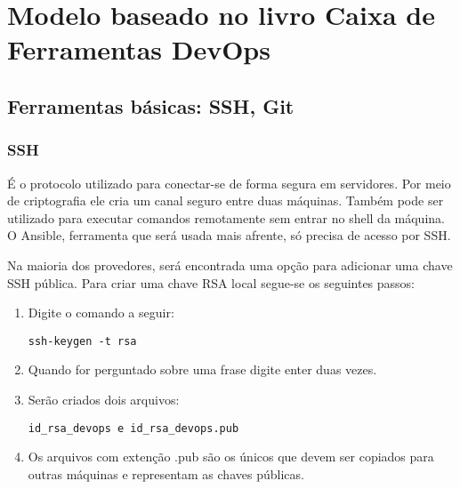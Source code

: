 

 

\section{Modelo baseado no livro Caixa de Ferramentas DevOps}

\subsection{Ferramentas básicas: SSH, Git}

\subsubsection{SSH}

É o protocolo utilizado para conectar-se de forma 
segura em servidores. Por meio de criptografia ele 
cria um canal seguro entre duas máquinas. Também 
pode ser utilizado para executar comandos 
remotamente sem entrar no shell da máquina.
O Ansible, ferramenta que será usada mais afrente, 
só precisa de acesso por SSH.

Na maioria dos provedores, será encontrada uma 
opção para adicionar uma chave SSH pública.
Para criar uma chave RSA local segue-se os 
seguintes passos:
 \begin{enumerate}
   \item Digite o comando a seguir:
	
      \begin{lstlisting}
ssh-keygen -t rsa
      \end{lstlisting}
   
   \item Quando for perguntado sobre uma frase digite 
      enter duas vezes.
    \item Serão criados dois arquivos:
    \begin{lstlisting}
id_rsa_devops e id_rsa_devops.pub
    \end{lstlisting}
    
    \item Os arquivos com extenção .pub são os únicos 
	  que devem ser copiados para outras máquinas 
	  e representam as chaves públicas.

 \end{enumerate} 

